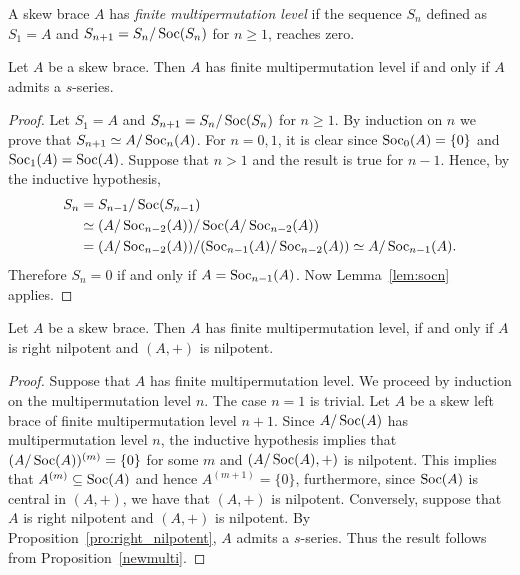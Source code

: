 

\begin{definition}
A skew brace $A$ has \emph{finite multipermutation level} if
the sequence $S_n$ defined as $S_1=A$ and $S_{n+1}=S_n/\operatorname{Soc}(S_n)$
for $n\geq1$, reaches zero.
\end{definition}

\begin{proposition}
\label{newmulti}
Let $A$ be a skew brace. Then $A$ has finite
multipermutation level if and only if $A$ admits a $s$-series.
\end{proposition}

\begin{proof}
Let $S_1=A$ and $S_{n+1}=S_n/\operatorname{Soc}(S_n)$ for
$n\geq1$. By induction on $n$ we prove that $S_{n+1}\simeq A/\operatorname{Soc}_n(A)$. 
For $n=0,1$, it is clear since $\operatorname{Soc}_0(A)=\{0\}$ and $\operatorname{Soc}_1(A)=\operatorname{Soc}(A)$.
Suppose that $n>1$ and the result is true for $n-1$. Hence, by the
inductive hypothesis,
\begin{align*}
S_n&=S_{n-1}/\operatorname{Soc}(S_{n-1})\\
&\simeq (A/\operatorname{Soc}_{n-2}(A))/\operatorname{Soc}(A/\operatorname{Soc}_{n-2}(A))\\
&=(A/\operatorname{Soc}_{n-2}(A))/(\operatorname{Soc}_{n-1}(A)/\operatorname{Soc}_{n-2}(A))\simeq A/\operatorname{Soc}_{n-1}(A).
\end{align*} 
Therefore $S_n=0$ if and only if
$A=\operatorname{Soc}_{n-1}(A)$. Now Lemma~\ref{lem:socn} applies.
\end{proof}

\begin{theorem}
\label{thm:mpl&right_nilpotent}
Let $A$ be a skew brace. Then $A$ has finite multipermutation level, if and only
if  $A$ is right nilpotent and $(A,+)$ is nilpotent.
\end{theorem}

\begin{proof}
Suppose that $A$ has finite multipermutation level.
We proceed by induction on the multipermutation level $n$. The case
$n=1$ is trivial.  Let $A$ be a skew left brace of
    finite multipermutation level $n+1$. Since $A/\operatorname{Soc}(A)$ has multipermutation
    level $n$, the inductive hypothesis implies that $(A/\operatorname{Soc}(A))^{(m)}=\{0\}$ for
    some $m$ and $(A/\operatorname{Soc}(A),+)$ is nilpotent. This implies that
    $A^{(m)}\subseteq\operatorname{Soc}(A)$ and hence $A^{(m+1)}=\{0\}$, furthermore, since
    $\operatorname{Soc}(A)$ is central in $(A,+)$, we have that $(A,+)$ is nilpotent.
Conversely, suppose that $A$ is right nilpotent and $(A,+)$ is
nilpotent.  By Proposition~\ref{pro:right_nilpotent}, $A$ admits a
$s$-series. Thus the result follows from Proposition~\ref{newmulti}.
\end{proof}

